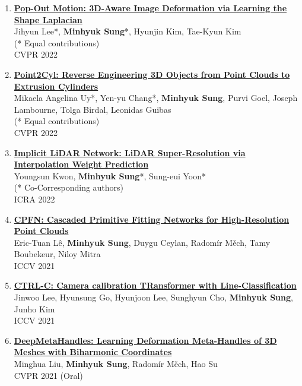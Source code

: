 \documentclass[letterpaper,10pt]{article} %
\newcommand{\blankline}{\quad\pagebreak[2]}
\begin{document}
{\begin{enumerate}
\item \label{cvpr22_2}
\href{https://arxiv.org/abs/2203.15235}{\textbf{Pop-Out Motion: 3D-Aware Image Deformation via Learning the Shape Laplacian}}\\
Jihyun Lee*, \textbf{Minhyuk Sung}*, Hyunjin Kim, Tae-Kyun Kim\\
(* Equal contributions)\\
CVPR 2022\\
\blankline

\item \label{cvpr22_1}
\href{https://arxiv.org/abs/2109.02259}{\textbf{Point2Cyl: Reverse Engineering 3D Objects from Point Clouds to Extrusion Cylinders}}\\
Mikaela Angelina Uy*, Yen-yu Chang*, \textbf{Minhyuk Sung}, Purvi Goel, Joseph Lambourne, Tolga Birdal, Leonidas Guibas\\
(* Equal contributions)\\
CVPR 2022\\
\blankline

\item \label{icra22}
\href{https://arxiv.org/abs/2203.06413}{\textbf{Implicit LiDAR Network: LiDAR Super-Resolution via Interpolation Weight Prediction}}\\
Youngsun Kwon, \textbf{Minhyuk Sung}*, Sung-eui Yoon*\\
(* Co-Corresponding authors)\\
ICRA 2022\\
\blankline

\item \label{iccv21_2}
\href{https://arxiv.org/abs/2109.00113}{\textbf{CPFN: Cascaded Primitive Fitting Networks for High-Resolution Point Clouds}}\\
Eric-Tuan Lê, \textbf{Minhyuk Sung}, Duygu Ceylan, Radomír Měch, Tamy Boubekeur, Niloy Mitra\\
ICCV 2021\\
\blankline

\item \label{iccv21_1}
\href{https://arxiv.org/abs/2109.02259}{\textbf{CTRL-C: Camera calibration TRansformer with Line-Classification}}\\
Jinwoo Lee, Hyunsung Go, Hyunjoon Lee, Sunghyun Cho, \textbf{Minhyuk Sung}, Junho Kim\\
ICCV 2021\\
\blankline

\item \label{cvpr21_3}
\href{https://mhsung.github.io/papers/deep-meta-handles.html}{\textbf{DeepMetaHandles: Learning Deformation Meta-Handles of 3D Meshes with Biharmonic Coordinates}}\\
Minghua Liu, \textbf{Minhyuk Sung}, Radomír Měch, Hao Su\\
CVPR 2021 (Oral)\\
\blankline


\end{enumerate}}
\end{document}
